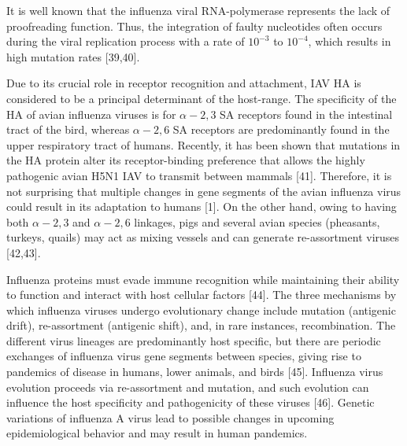 \documentclass[onecolumn, compsoc,10pt]{IEEEtran}
\begin{document}
{\color{Green1}


It is well known that the influenza viral RNA-polymerase represents the lack of proofreading function. Thus, the integration of faulty nucleotides often occurs during the viral replication process with a rate of $10^{-3}$ to $10^{-4}$, which results in high mutation rates [39,40].



  
Due to its crucial role in receptor recognition and attachment, IAV HA is considered to be a principal determinant of the host-range. The specificity of the HA of avian influenza viruses is for $\alpha-2,3$ SA receptors found in the intestinal tract of the bird, whereas $\alpha-2,6$ SA receptors are predominantly found in the upper respiratory tract of humans. Recently, it has been shown that mutations in the HA protein alter its receptor-binding preference that allows the highly pathogenic avian H5N1 IAV to transmit between mammals [41]. Therefore, it is not surprising that multiple changes in gene segments of the avian influenza virus could result in its adaptation to humans [1]. On the other hand, owing to having both $\alpha-2,3$ and $\alpha-2,6$  linkages, pigs and several avian species (pheasants, turkeys, quails) may act as mixing vessels and can generate re-assortment viruses [42,43].


Influenza proteins must evade immune recognition while maintaining their ability to function and interact with host cellular factors [44]. The three mechanisms by which influenza viruses undergo evolutionary change include mutation (antigenic drift), re-assortment (antigenic shift), and, in rare instances, recombination. The different virus lineages are predominantly host specific, but there are periodic exchanges of influenza virus gene segments between species, giving rise to pandemics of disease in humans, lower animals, and birds [45]. Influenza virus evolution proceeds via re-assortment and mutation, and such evolution can influence the host specificity and pathogenicity of these viruses [46]. Genetic variations of influenza A virus lead to possible changes in upcoming epidemiological behavior and may result in human pandemics.


}
\end{document}
